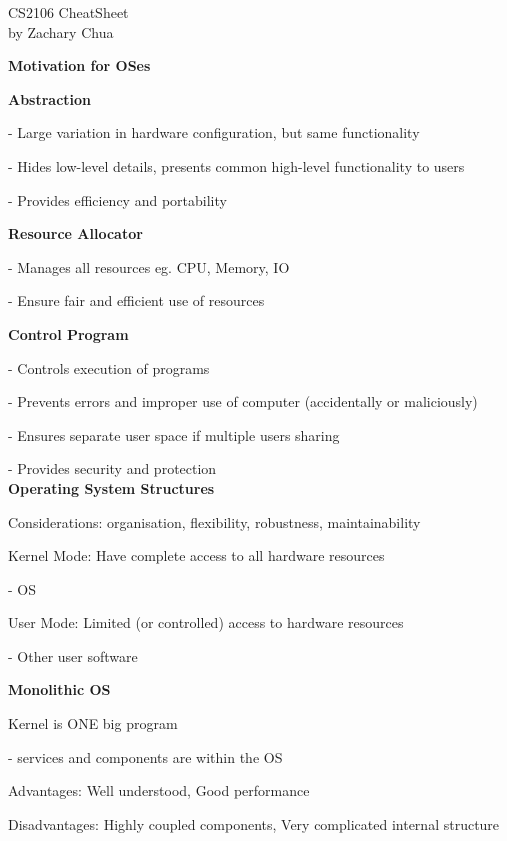 \documentclass[10pt, a4paper]{article}
\author{Zachary Chua Yan Ern}
\date{March 2022}
\newcommand{\blue}[1]{{\color{MidnightBlue}#1}}
\newcommand{\red}[1]{{\color{red}#1}}
\newcommand{\green}[1]{{\color{ForestGreen}#1}}
\newcommand{\header}[1]{{\normalsize\textbf{#1}}}
\newcommand{\tab}[0]{\hspace*{2mm}}
\begin{document}
	\scriptsize %
	\setlength\parindent{0pt}
	\setlength{\columnseprule}{0.1pt}
	
	\begin{center}
		{\large CS2106 CheatSheet}\\
		by Zachary Chua
	\end{center}

	\begin{multicols*}{3}
		\header{Motivation for OSes}

		\textbf{Abstraction}

		- Large variation in hardware configuration, but same functionality

		- \red{Hides} low-level details, presents common \blue{high-level} functionality to users

		- Provides \red{efficiency} and \red{portability}

		\textbf{Resource Allocator}

		- Manages all resources eg. CPU, Memory, IO

		- Ensure \red{fair} and \red{efficient} use of resources

		\textbf{Control Program}

		- Controls execution of programs

		- Prevents errors and improper use of computer (accidentally or maliciously)

		- Ensures separate user space if multiple users sharing

		- Provides security and protection\\

		\header{Operating System Structures}

		Considerations: organisation, flexibility, robustness, maintainability

		Kernel Mode: Have complete access to all hardware resources

		\tab - OS

		User Mode: Limited (or controlled) access to hardware resources

		\tab - Other user software

		\textbf{Monolithic OS}

		Kernel is \red{ONE big program}

		- services and components are within the OS

		\green{Advantages}: Well understood, Good performance

		\red{Disadvantages}: Highly coupled components, Very complicated internal structure


\end{multicols*}
\end{document}
